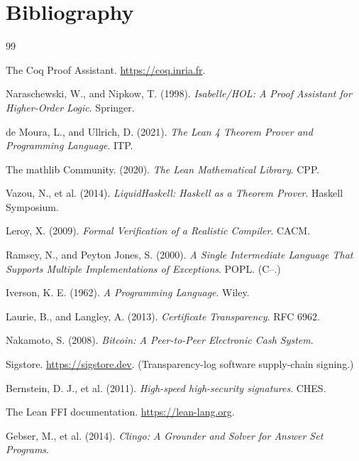 \chapter{Bibliography}
\label{app:bibliography}

\begin{thebibliography}{99}

 The Coq Proof Assistant. \url{https://coq.inria.fr}.

 Naraschewski, W., and Nipkow, T. (1998).
\textit{Isabelle/HOL: A Proof Assistant for Higher-Order Logic}. Springer.

 de Moura, L., and Ullrich, D. (2021).
\textit{The Lean 4 Theorem Prover and Programming Language}. ITP.

 The mathlib Community. (2020).
\textit{The Lean Mathematical Library}. CPP.

 Vazou, N., et al. (2014).
\textit{LiquidHaskell: Haskell as a Theorem Prover}. Haskell Symposium.

 Leroy, X. (2009).
\textit{Formal Verification of a Realistic Compiler}. CACM.

 Ramsey, N., and Peyton Jones, S. (2000).
\textit{A Single Intermediate Language That Supports Multiple Implementations
of Exceptions}. POPL. (C{--}.)

 Iverson, K. E. (1962).
\textit{A Programming Language}. Wiley.

 Laurie, B., and Langley, A. (2013).
\textit{Certificate Transparency}. RFC 6962.

 Nakamoto, S. (2008).
\textit{Bitcoin: A Peer-to-Peer Electronic Cash System}.

 Sigstore. \url{https://sigstore.dev}. (Transparency-log
software supply-chain signing.)

 Bernstein, D. J., et al. (2011).
\textit{High-speed high-security signatures}. CHES.

 The Lean FFI documentation. \url{https://lean-lang.org}.

 Gebser, M., et al. (2014).
\textit{Clingo: A Grounder and Solver for Answer Set Programs}.

\end{thebibliography}
